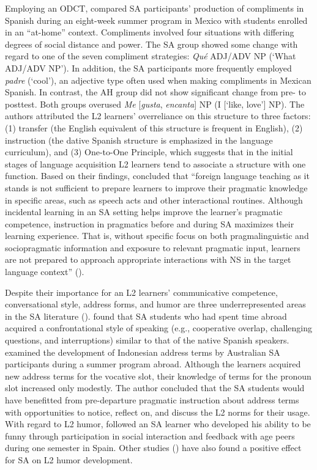\documentclass[output=paper]{langscibook}
\begin{document}
  Employing an ODCT, \citet{Félix-BrasdeferHasler-Barker2015} compared SA participants’ production of compliments in Spanish during an eight-week summer program in Mexico with students enrolled in an “at-home” context. Compliments involved four situations with differing degrees of social distance and power. The SA group showed some change with regard to one of the seven compliment strategies: \textit{Qué} ADJ/ADV NP (`What ADJ/ADV NP'). In addition, the SA participants more frequently employed \textit{padre} (‘cool’), an adjective type often used when making compliments in Mexican Spanish. In contrast, the AH group did not show significant change from pre- to posttest. Both groups overused \textit{Me} [\textit{gusta}, \textit{encanta}] NP (I [‘like, love’] NP). The authors attributed the L2 learners’ overreliance on this structure to three factors:
  (1) transfer (the English equivalent of this structure is frequent in English),
  (2) instruction (the dative Spanish structure is emphasized in the language curriculum), and
  (3)  One-to-One Principle, which suggests that in the initial stages of language acquisition L2 learners tend to associate a structure with one function. Based on their findings, \citeauthor{Félix-BrasdeferHasler-Barker2015} concluded that “foreign language teaching as it stands is not sufficient to prepare learners to improve their pragmatic knowledge in specific areas, such as speech acts and other interactional routines. Although incidental learning in an SA setting helps improve the learner’s pragmatic competence, instruction in pragmatics before and during SA maximizes their learning experience. That is, without specific focus on both pragmalinguistic and sociopragmatic information and exposure to relevant pragmatic input, learners are not prepared to approach appropriate interactions with NS in the target language context” (\citeyear[85]{Félix-BrasdeferHasler-Barker2015}).

  Despite their importance for an L2 learners’ communicative competence, conversational style, address forms, and humor are three underrepresented areas in the SA literature (\citealt{Cordelia1996,Iwasaki2008,PérezVidalShively2019,Shively2011}). \citet{Cordelia1996} found that SA students who had spent time abroad acquired a confrontational style of speaking (e.g., cooperative overlap, challenging questions, and interruptions) similar to that of the native Spanish speakers. \citet{Hassall2013,Hassall2015a,Hassall2015b} examined the development of Indonesian address terms by Australian SA participants during a summer program abroad. Although the learners acquired new address terms for the vocative slot, their knowledge of terms for the pronoun slot increased only modestly. The author concluded that the SA students would have benefitted from pre-departure pragmatic instruction about address terms with opportunities to notice, reflect on, and discuss the L2 norms for their usage. With regard to L2 humor, \citet{Shively2013} followed an SA learner who developed his ability to be funny through participation in social interaction and feedback with age peers during one semester in Spain. Other studies (\citealt{BellSalsbury2014,Kinginger2015}) have also found a positive effect for SA on L2 humor development.
\end{document}
